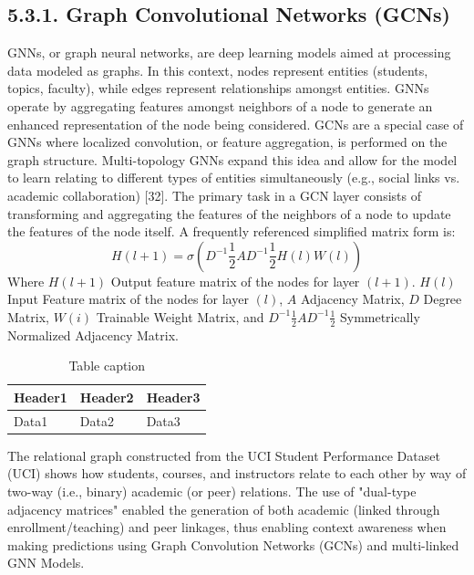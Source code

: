 \documentclass[twocolumn]{svjour3}
\begin{document}
\subsection{5.3.1. Graph Convolutional Networks (GCNs)}
GNNs, or graph neural networks, are deep learning models aimed at processing data modeled as graphs. In this context, nodes represent entities (students, topics, faculty), while edges represent relationships amongst entities. GNNs operate by aggregating features amongst neighbors of a node to generate an enhanced representation of the node being considered. GCNs are a special case of GNNs where localized convolution, or feature aggregation, is performed on the graph structure. Multi-topology GNNs expand this idea and allow for the model to learn relating to different types of entities simultaneously (e.g., social links vs. academic collaboration) [32].
The primary task in a GCN layer consists of transforming and aggregating the features of the neighbors of a node to update the features of the node itself. A frequently referenced simplified matrix form is:
\begin{equation}
H(l+1) = \sigma(D^{-1} \frac{1}{2}AD^{-1} \frac{1}{2}H(l)W(l))
\end{equation}
Where $H(l+1)$ Output feature matrix of the nodes for layer $(l+1)$. $H(l)$ Input Feature matrix of the nodes for layer $(l)$, $A$ Adjacency Matrix, $D$ Degree Matrix, $W(i)$ Trainable Weight Matrix, and $D^{-1} \frac{1}{2}AD^{-1} \frac{1}{2}$ Symmetrically Normalized Adjacency Matrix.
\begin{table}
\centering
\caption{Table caption}
\begin{tabular}{lll}
\hline
Header1 & Header2 & Header3 \\
\hline
Data1 & Data2 & Data3 \\
\hline
\end{tabular}
\end{table}
The relational graph constructed from the UCI Student Performance Dataset (UCI) shows how students, courses, and instructors relate to each other by way of two-way (i.e., binary) academic (or peer) relations. The use of "dual-type adjacency matrices" enabled the generation of both academic (linked through enrollment/teaching) and peer linkages, thus enabling context awareness when making predictions using Graph Convolution Networks (GCNs) and multi-linked GNN Models.
\end{document}
